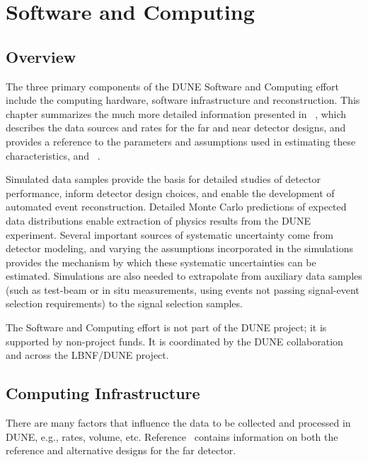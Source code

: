 \chapter{Software and Computing}
\label{ch:detectors-sc}

\section{Overview}

The three primary
components of the DUNE Software and Computing effort include the computing hardware, software
infrastructure and reconstruction. This chapter summarizes the much more detailed information presented in \anxrates~\cite{cdr-annex-rates}, which describes the data sources and rates for the far and near detector designs, and provides a reference to the parameters and assumptions used in estimating these characteristics, and \anxreco~\cite{cdr-annex-reco}. 

Simulated data samples provide the basis for detailed studies of detector performance, inform detector design choices, and enable the development of automated event reconstruction. Detailed Monte Carlo predictions of expected data distributions enable extraction of physics results from the DUNE experiment. Several important sources of systematic uncertainty come from detector modeling, and varying the assumptions incorporated in the simulations provides the mechanism by which these systematic uncertainties can be estimated. Simulations are also needed to extrapolate from auxiliary data samples (such as test-beam or in situ measurements, using events not passing signal-event selection requirements) to the signal selection samples. 

The Software and Computing effort is not part of the DUNE project; it 
is supported by non-project funds. It is coordinated by the
DUNE collaboration and across the LBNF/DUNE project. 

\section{Computing Infrastructure}
\label{sec:detectors-sc-infrastructure}

There are many factors that influence the
data to be collected and processed in DUNE, e.g., rates, volume, etc.  Reference~\cite{cdr-annex-rates} 
contains information on both the reference and alternative
designs for the far detector.

